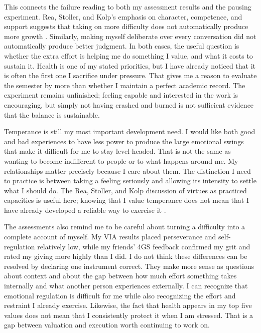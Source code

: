 \documentclass[12pt,stu,biblatex]{apa7}
\begin{document}
This connects the failure reading to both my assessment results and the pausing experiment.
Rea, Stoller, and Kolp's emphasis on character, competence, and support suggests that taking on more difficulty does not automatically produce more growth \parencite[ch. 1]{Rea2022better}.
Similarly, making myself deliberate over every conversation did not automatically produce better judgment.
In both cases, the useful question is whether the extra effort is helping me do something I value, and what it costs to sustain it.
Health is one of my stated priorities, but I have already noticed that it is often the first one I sacrifice under pressure.
That gives me a reason to evaluate the semester by more than whether I maintain a perfect academic record.
The experiment remains unfinished; feeling capable and interested in the work is encouraging, but simply not having crashed and burned is not sufficient evidence that the balance is sustainable.

Temperance is still my most important development need.
I would like both good and bad experiences to have less power to produce the large emotional swings that make it difficult for me to stay level-headed.
That is not the same as wanting to become indifferent to people or to what happens around me.
My relationships matter precisely because I care about them.
The distinction I need to practice is between taking a feeling seriously and allowing its intensity to settle what I should do.
The Rea, Stoller, and Kolp discussion of virtues as practiced capacities is useful here; knowing that I value temperance does not mean that I have already developed a reliable way to exercise it \parencite[ch. 2]{Rea2022better}.

The assessments also remind me to be careful about turning a difficulty into a complete account of myself.
My VIA results placed perseverance and self-regulation relatively low, while my friends' 4GS feedback confirmed my grit and rated my giving more highly than I did.
I do not think these differences can be resolved by declaring one instrument correct.
They make more sense as questions about context and about the gap between how much effort something takes internally and what another person experiences externally.
I can recognize that emotional regulation is difficult for me while also recognizing the effort and restraint I already exercise.
Likewise, the fact that health appears in my top five values does not mean that I consistently protect it when I am stressed.
That is a gap between valuation and execution worth continuing to work on.
\end{document}
